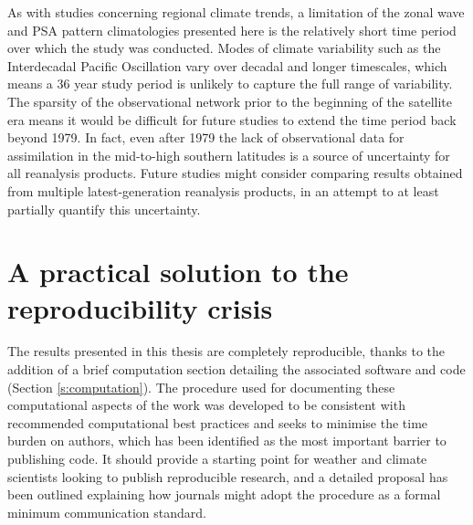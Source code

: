 As with studies concerning regional climate trends, a limitation of the zonal wave and PSA pattern climatologies presented here is the relatively short time period over which the study was conducted. Modes of climate variability such as the Interdecadal Pacific Oscillation \citep{Power1999} vary over decadal and longer timescales, which means a 36 year study period is unlikely to capture the full range of variability. The sparsity of the observational network prior to the beginning of the satellite era means it would be difficult for future studies to extend the time period back beyond 1979. In fact, even after 1979 the lack of observational data for assimilation in the mid-to-high southern latitudes is a source of uncertainty for all reanalysis products. Future studies might consider comparing results obtained from multiple latest-generation reanalysis products, in an attempt to at least partially quantify this uncertainty. 


\section{A practical solution to the reproducibility crisis}

The results presented in this thesis are completely reproducible, thanks to the addition of a brief computation section detailing the associated software and code (Section \ref{s:computation}). The procedure used for documenting these computational aspects of the work was developed to be consistent with recommended computational best practices and seeks to minimise the time burden on authors, which has been identified as the most important barrier to publishing code. It should provide a starting point for weather and climate scientists looking to publish reproducible research, and a detailed proposal has been outlined explaining how journals might adopt the procedure as a formal minimum communication standard.

